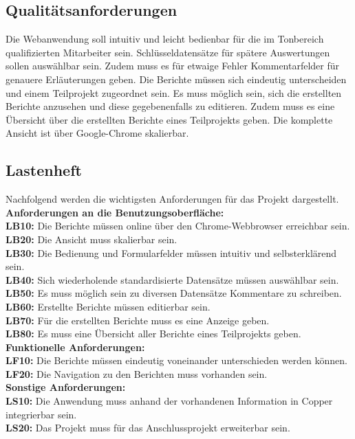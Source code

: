 \subsection{Qualitätsanforderungen}
\label{sec:Qualitaetsanforderungen}
Die Webanwendung soll intuitiv und leicht bedienbar für die im Tonbereich qualifizierten Mitarbeiter sein. Schlüsseldatensätze für spätere Auswertungen sollen auswählbar sein. Zudem muss es für etwaige Fehler Kommentarfelder für genauere Erläuterungen geben. Die Berichte müssen sich eindeutig unterscheiden und einem Teilprojekt zugeordnet sein. Es muss möglich sein, sich die erstellten Berichte anzusehen und diese gegebenenfalls zu editieren. Zudem muss es eine Übersicht über die erstellten Berichte eines Teilprojekts geben. Die komplette Ansicht ist über Google-Chrome skalierbar.

\subsection{Lastenheft}
\label{sec:Lastenheft}
Nachfolgend werden die wichtigsten Anforderungen für das Projekt dargestellt.\\[1.5ex]
\textbf{Anforderungen an die Benutzungsoberfläche:}\\[1.5ex]
\textbf{LB10:} Die Berichte müssen online über den Chrome-Webbrowser erreichbar sein.\\
\textbf{LB20:} Die Ansicht muss skalierbar sein.\\
\textbf{LB30:} Die Bedienung und Formularfelder müssen intuitiv und selbsterklärend sein.\\
\textbf{LB40:} Sich wiederholende standardisierte Datensätze müssen auswählbar sein.\\
\textbf{LB50:} Es muss möglich sein zu diversen Datensätze Kommentare zu schreiben.\\
\textbf{LB60:} Erstellte Berichte müssen editierbar sein.\\
\textbf{LB70:} Für die erstellten Berichte muss es eine Anzeige geben.\\
\textbf{LB80:} Es muss eine Übersicht aller Berichte eines Teilprojekts geben.\\[1.5ex]
\textbf{Funktionelle Anforderungen:}\\[1.5ex]
\textbf{LF10:} Die Berichte müssen eindeutig voneinander unterschieden werden können.\\
\textbf{LF20:} Die Navigation zu den Berichten muss vorhanden sein.\\[1.5ex]
\textbf{Sonstige Anforderungen:}\\[1.5ex]
\textbf{LS10:} Die Anwendung muss anhand der vorhandenen Information in Copper integrierbar sein.\\
\textbf{LS20:} Das Projekt muss für das Anschlussprojekt erweiterbar sein.

